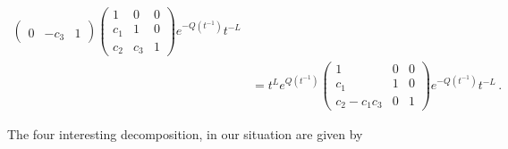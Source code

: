 \begin{exmp}
\begin{align*}
\begin{pmatrix}
    \\0     & -c_3 & 1
    \end{pmatrix}
    \begin{pmatrix}
      1     & 0 & 0
    \\c_1     & 1     & 0
    \\c_2     & c_3 & 1
    \end{pmatrix}
    e^{-Q(t^{-1})}t^{-L}
  \\&=t^{L}e^{Q(t^{-1})}
    \begin{pmatrix}
      1     & 0 & 0
    \\c_1     & 1          & 0
    \\c_2-c_1c_3     & 0          & 1
    \end{pmatrix}
    e^{-Q(t^{-1})}t^{-L}
    \,.
  \end{align*}
\end{exmp}
The four interesting decomposition, in our situation are given by
